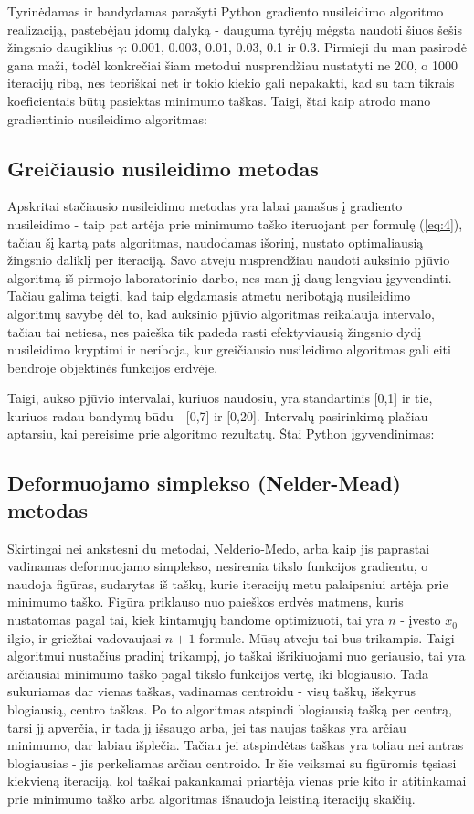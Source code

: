 \documentclass{article}
\begin{document}
Tyrinėdamas ir bandydamas parašyti Python gradiento nusileidimo algoritmo realizaciją, pastebėjau įdomų dalyką - dauguma tyrėjų mėgsta naudoti šiuos šešis žingsnio daugiklius $\gamma$: 0.001, 0.003, 0.01, 0.03, 0.1 ir 0.3. Pirmieji du man pasirodė gana maži, todėl konkrečiai šiam metodui nusprendžiau nustatyti ne 200, o 1000 iteracijų ribą, nes teoriškai net ir tokio kiekio gali nepakakti, kad su tam tikrais koeficientais būtų pasiektas minimumo taškas. Taigi, štai kaip atrodo mano gradientinio nusileidimo algoritmas:
\subsection{Greičiausio nusileidimo metodas}
Apskritai stačiausio nusileidimo metodas yra labai panašus į gradiento nusileidimo - taip pat artėja prie minimumo taško iteruojant per formulę (\ref{eq:4}), tačiau šį kartą pats algoritmas, naudodamas išorinį, nustato optimaliausią žingsnio daliklį per iteraciją. Savo atveju nusprendžiau naudoti auksinio pjūvio algoritmą iš pirmojo laboratorinio darbo, nes man jį daug lengviau įgyvendinti. Tačiau galima teigti, kad taip elgdamasis atmetu neribotąją nusileidimo algoritmų savybę dėl to, kad auksinio pjūvio algoritmas reikalauja intervalo, tačiau tai netiesa, nes paieška tik padeda rasti efektyviausią žingsnio dydį nusileidimo kryptimi ir neriboja, kur greičiausio nusileidimo algoritmas gali eiti bendroje objektinės funkcijos erdvėje.

Taigi, aukso pjūvio intervalai, kuriuos naudosiu, yra standartinis [0,1] ir tie, kuriuos radau bandymų būdu - [0,7] ir [0,20]. Intervalų pasirinkimą plačiau aptarsiu, kai pereisime prie algoritmo rezultatų. Štai Python įgyvendinimas:
\subsection{Deformuojamo simplekso (Nelder-Mead) metodas}
Skirtingai nei ankstesni du metodai, Nelderio-Medo, arba kaip jis paprastai vadinamas deformuojamo simplekso, nesiremia tikslo funkcijos gradientu, o naudoja figūras, sudarytas iš taškų, kurie iteracijų metu palaipsniui artėja prie minimumo taško. Figūra priklauso nuo paieškos erdvės matmens, kuris nustatomas pagal tai, kiek kintamųjų bandome optimizuoti, tai yra $n$ - įvesto $x_{0}$ ilgio, ir griežtai vadovaujasi $n+1$ formule. Mūsų atveju tai bus trikampis. Taigi algoritmui nustačius pradinį trikampį, jo taškai išrikiuojami nuo geriausio, tai yra arčiausiai minimumo taško pagal tikslo funkcijos vertę, iki blogiausio. Tada sukuriamas dar vienas taškas, vadinamas centroidu - visų taškų, išskyrus blogiausią, centro taškas. Po to algoritmas atspindi blogiausią tašką per centrą, tarsi jį apverčia, ir tada jį išsaugo arba, jei tas naujas taškas yra arčiau minimumo, dar labiau išplečia. Tačiau jei atspindėtas taškas yra toliau nei antras blogiausias - jis perkeliamas arčiau centroido. Ir šie veiksmai su figūromis tęsiasi kiekvieną iteraciją, kol taškai pakankamai priartėja vienas prie kito ir atitinkamai prie minimumo taško arba algoritmas išnaudoja leistiną iteracijų skaičių.
\end{document}
